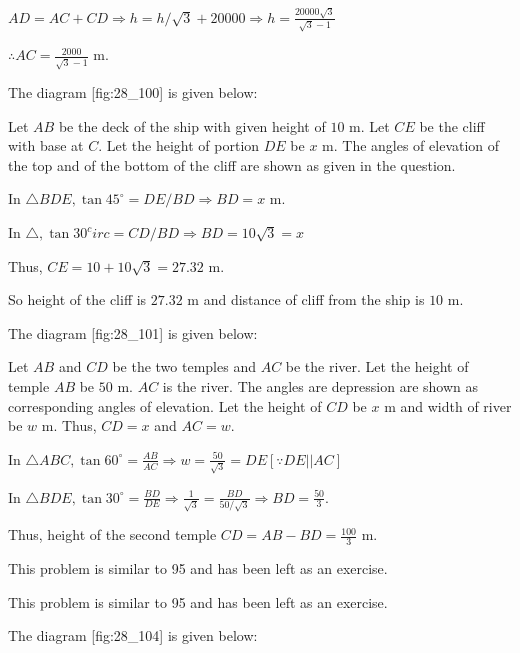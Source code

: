   $AD = AC + CD \Rightarrow h = h/\sqrt{3} + 20000 \Rightarrow h = \frac{20000\sqrt{3}}{\sqrt{3} - 1}$

  $\therefore AC = \frac{2000}{\sqrt{3} - 1}$ m.

\item The diagram [fig:28_100] is given below:

  \startplacefigure[reference=fig:28_100]
    \externalfigure[28_100.pdf]
  \stopplacefigure

  Let $AB$ be the deck of the ship with given height of $10$ m. Let $CE$ be the cliff with base at
  $C$. Let the height of portion $DE$ be $x$ m. The angles of elevation of the top and of the bottom of the
  cliff are shown as given in the question.

  In $\triangle BDE, \tan45^\circ = DE/BD \Rightarrow BD = x$ m.

  In $\triangle, \tan30^circ = CD/BD \Rightarrow BD = 10\sqrt{3} = x$

  Thus, $CE = 10 + 10\sqrt{3} = 27.32$ m.

  So height of the cliff is $27.32$ m and distance of cliff from the ship is $10$ m.
\item The diagram [fig:28_101] is given below:

  \startplacefigure[reference=fig:28_101]
    \externalfigure[28_101.pdf]
  \stopplacefigure

  Let $AB$ and $CD$ be the two temples and $AC$ be the river. Let the height of temple $AB$ be
  $50$ m. $AC$ is the river. The angles are depression are shown as corresponding angles of elevation. Let the
  height of $CD$ be $x$ m and width of river be $w$ m. Thus, $CD = x$ and $AC = w$.

  In $\triangle ABC, \tan60^\circ = \frac{AB}{AC} \Rightarrow w = \frac{50}{\sqrt{3}} = DE[\because DE||AC]$

  In $\triangle BDE, \tan30^\circ = \frac{BD}{DE} \Rightarrow \frac{1}{\sqrt{3}} = \frac{BD}{50/\sqrt{3}}\Rightarrow BD =
  \frac{50}{3}$.

  Thus, height of the second temple $CD = AB - BD = \frac{100}{3}$ m.

\item This problem is similar to 95 and has been left as an exercise.

\item This problem is similar to 95 and has been left as an exercise.

\item The diagram [fig:28_104] is given below:

